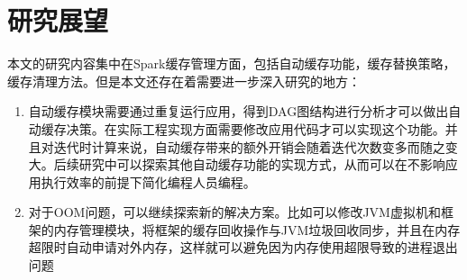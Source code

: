 \section{研究展望}

本文的研究内容集中在Spark缓存管理方面，包括自动缓存功能，缓存替换策略，缓存清理方法。但是本文还存在着需要进一步深入研究的地方：

\begin{enumerate}
    \item 自动缓存模块需要通过重复运行应用，得到DAG图结构进行分析才可以做出自动缓存决策。在实际工程实现方面需要修改应用代码才可以实现这个功能。并且对迭代时计算来说，自动缓存带来的额外开销会随着迭代次数变多而随之变大。后续研究中可以探索其他自动缓存功能的实现方式，从而可以在不影响应用执行效率的前提下简化编程人员编程。
    \item 对于OOM问题，可以继续探索新的解决方案。比如可以修改JVM虚拟机和框架的内存管理模块，将框架的缓存回收操作与JVM垃圾回收同步，并且在内存超限时自动申请对外内存，这样就可以避免因为内存使用超限导致的进程退出问题
\end{enumerate}